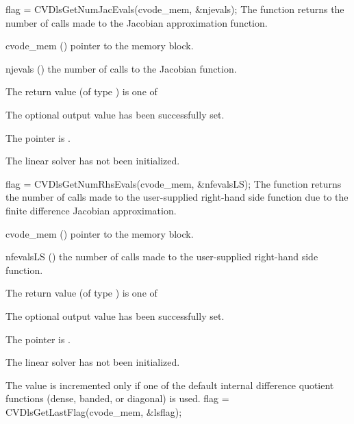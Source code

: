 {
  flag = CVDlsGetNumJacEvals(cvode\_mem, \&njevals);
}
{
  The function  returns the
  number of calls made to the {\cvdls} Jacobian approximation
  function. 
}
{
  \begin{args}
  \item[cvode\_mem] ()
    pointer to the {\cvode} memory block.
  \item[njevals] ()
    the number of calls to the Jacobian function.
  \end{args}
}
{
  The return value  (of type ) is one of
  \begin{args}
  \item[\Id{CVDLS\_SUCCESS}] 
    The optional output value has been successfully set.
  \item[\Id{CVDLS\_MEM\_NULL}]
    The  pointer is .
  \item[\Id{CVDLS\_LMEM\_NULL}]
    The {\cvdls} linear solver has not been initialized.
  \end{args}
}
{}
{
  flag = CVDlsGetNumRhsEvals(cvode\_mem, \&nfevalsLS);
}
{
  The function  returns the
  number of calls made to the user-supplied right-hand side function
  due to the finite difference Jacobian approximation.
}
{
  \begin{args}
  \item[cvode\_mem] ()
    pointer to the {\cvode} memory block.
  \item[nfevalsLS] ()
    the number of calls made to the user-supplied right-hand side function.
  \end{args}
}
{
  The return value  (of type ) is one of
  \begin{args}
  \item[\Id{CVDLS\_SUCCESS}] 
    The optional output value has been successfully set.
  \item[\Id{CVDLS\_MEM\_NULL}]
    The  pointer is .
  \item[\Id{CVDLS\_LMEM\_NULL}]
    The {\cvdls} linear solver has not been initialized.
  \end{args}
}
{
  The value  is incremented only if one of the default 
  internal difference quotient functions (dense, banded, or diagonal) is
  used.
}
{
  flag = CVDlsGetLastFlag(cvode\_mem, \&lsflag);
}
